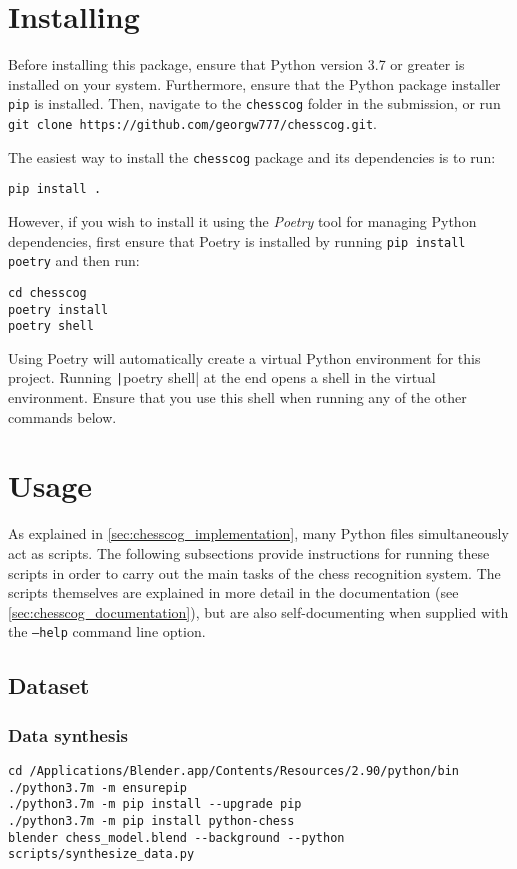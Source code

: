 \documentclass[../../report.tex]{subfiles}
\begin{document}
\section{Installing}
Before installing this package, ensure that Python version 3.7 or greater is installed on your system.
Furthermore, ensure that the Python package installer \texttt{pip} is installed.
Then, navigate to the \texttt{chesscog} folder in the submission, or run \texttt{git clone https://github.com/georgw777/chesscog.git}.

The easiest way to install the \texttt{chesscog} package and its dependencies is to run:
\begin{verbatim}
pip install .
\end{verbatim}

However, if you wish to install it using the \emph{Poetry} tool for managing Python dependencies, first ensure that Poetry is installed by running \texttt{pip install poetry} and then run:
\begin{verbatim}
cd chesscog
poetry install
poetry shell
\end{verbatim}
Using Poetry will automatically create a virtual Python environment for this project.
Running \texttt|poetry shell| at the end opens a shell in the virtual environment. 
Ensure that you use this shell when running any of the other commands below.

\section{Usage}

As explained in \cref{sec:chesscog_implementation}, many Python files simultaneously act as scripts.
The following subsections provide instructions for running these scripts in order to carry out the main tasks of the chess recognition system.
The scripts themselves are explained in more detail in the documentation (see \cref{sec:chesscog_documentation}), but are also self-documenting when supplied with the \texttt{--help} command line option.

\subsection{Dataset}
\label{sec:user_man_chesscog_dataset}
\subsubsection{Data synthesis}
\begin{verbatim}
cd /Applications/Blender.app/Contents/Resources/2.90/python/bin
./python3.7m -m ensurepip
./python3.7m -m pip install --upgrade pip
./python3.7m -m pip install python-chess
blender chess_model.blend --background --python scripts/synthesize_data.py
\end{verbatim}
\end{document}
